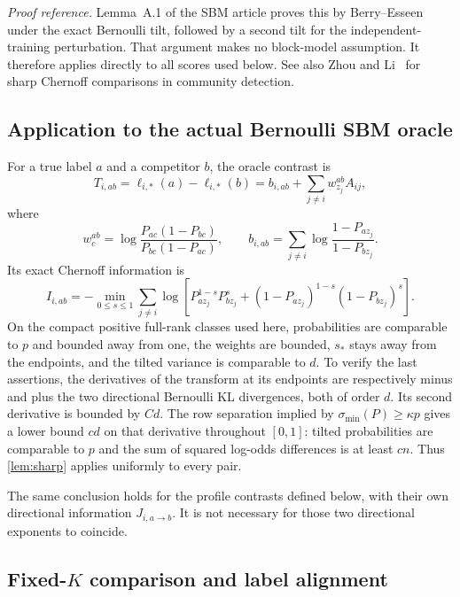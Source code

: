 \noindent\emph{Proof reference.}
Lemma~A.1 of the SBM article proves this by
Berry--Esseen under the exact Bernoulli tilt, followed by a second tilt
for the independent-training perturbation. That argument makes no
block-model assumption. It therefore applies directly to all scores
used below. See also Zhou and Li~\cite{zhouli} for sharp Chernoff
comparisons in community detection.

\subsection{Application to the actual Bernoulli SBM oracle}

For a true label $a$ and a competitor $b$, the oracle contrast is
\[
 T_{i,ab}=\ell_{i,*}(a)-\ell_{i,*}(b)
 =b_{i,ab}+\sum_{j\ne i}w^{ab}_{z_j}A_{ij},
\]
where
\begin{equation}\label{eq:sbm-weights}
 w_c^{ab}=\log\frac{P_{ac}(1-P_{bc})}{P_{bc}(1-P_{ac})},\qquad
 b_{i,ab}=\sum_{j\ne i}\log\frac{1-P_{az_j}}{1-P_{bz_j}}.
\end{equation}
Its exact Chernoff information is
\begin{equation}\label{eq:sbm-information}
 I_{i,ab}= -\min_{0\le s\le1}
 \sum_{j\ne i}\log\left[
 P_{az_j}^{1-s}P_{bz_j}^{s}
 +(1-P_{az_j})^{1-s}(1-P_{bz_j})^{s}\right].
\end{equation}
On the compact positive full-rank classes used here, probabilities are
comparable to $p$ and bounded away from one, the weights are bounded,
$s_*$ stays away from the endpoints, and the tilted variance is comparable
to $d$. To verify the last assertions, the derivatives of the transform
at its endpoints are respectively minus and plus the two directional
Bernoulli KL divergences, both of order $d$. Its second derivative is
bounded by $Cd$. The row separation implied by
$\sigma_{\min}(P)\ge\kappa p$ gives a lower bound $cd$ on that derivative
throughout $[0,1]$: tilted probabilities are comparable to $p$ and the
sum of squared log-odds differences is at least $cn$.
Thus \cref{lem:sharp} applies uniformly to every pair.

The same conclusion holds for the profile contrasts defined below, with
their own directional information $J_{i,a\to b}$.
It is not necessary for those two directional exponents to coincide.

\subsection{Fixed-\texorpdfstring{$K$}{K} comparison and label alignment}

